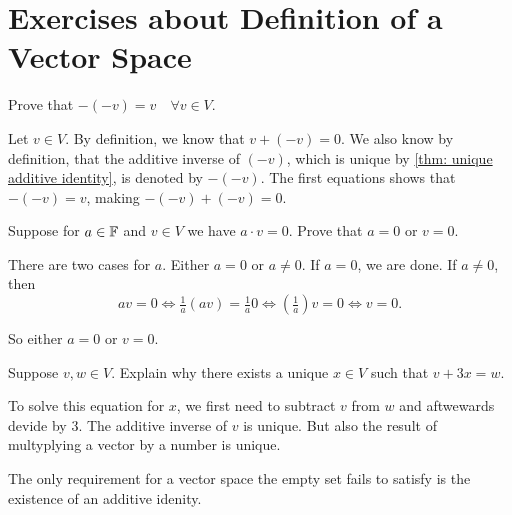 \section*{Exercises about Definition of a Vector Space}

\begin{xrcs}
  Prove that $-(-v) = v \quad \forall v \in V$.

  \begin{xprf}
    Let $v \in V$. By definition, we know that $v + (-v) = 0$. We also know by definition, that the additive inverse of $(-v)$, which is unique by \ref{thm: unique additive identity}, is denoted by $-(-v)$. The first equations shows that $-(-v) = v$, making $-(-v) + (-v) = 0$.
  \end{xprf}
\end{xrcs}

\begin{xrcs}
  Suppose for $a \in \mathbb{F}$ and $v \in V$ we have $a \cdot v = 0$. Prove that $a=0$ or $v=0$.

  \begin{xprf}
    There are two cases for $a$. Either $a=0$ or $a\neq 0$. If $a=0$, we are done. If $a \neq 0$, then
    \[
    av=0 \iff \tfrac{1}{a}(av)=\tfrac{1}{a}0 \iff \left(\tfrac{1}{a} \right)v = 0 \iff v = 0.
    \]

    So either $a=0$ or $v=0$.
  \end{xprf}
\end{xrcs}


\begin{xrcs}
  Suppose $v,w \in V$. Explain why there exists a unique $x \in V$ such that $v + 3x = w$.

  \begin{xsol}
    To solve this equation for $x$, we first need to subtract $v$ from $w$ and aftwewards devide by $3$. The additive inverse of $v$ is unique. But also the result of multyplying a vector by a number is unique.
  \end{xsol}
\end{xrcs}

\begin{xrcs}

\begin{xsol}
    The only requirement for a vector space the empty set fails to satisfy is the existence of an additive idenity.
\end{xsol}

\end{xrcs}

